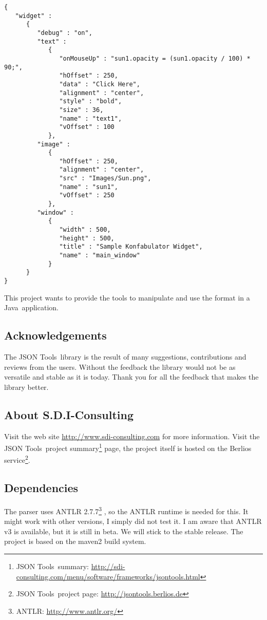 \documentclass[a4paper]{article}
\newcommand{\jtools}{JSON Tools}
\newcommand{\java}{Java}
\begin{document}
\medskip
\begin{lstlisting}
{
   "widget" :
      {
         "debug" : "on",
         "text" :
            {
               "onMouseUp" : "sun1.opacity = (sun1.opacity / 100) * 90;",
               "hOffset" : 250,
               "data" : "Click Here",
               "alignment" : "center",
               "style" : "bold",
               "size" : 36,
               "name" : "text1",
               "vOffset" : 100
            },
         "image" :
            {
               "hOffset" : 250,
               "alignment" : "center",
               "src" : "Images/Sun.png",
               "name" : "sun1",
               "vOffset" : 250
            },
         "window" :
            {
               "width" : 500,
               "height" : 500,
               "title" : "Sample Konfabulator Widget",
               "name" : "main_window"
            }
      }
}
\end{lstlisting}
\medskip

This project wants to provide the tools to manipulate and use the format in a \java\ application. 

\subsection{Acknowledgements}
The \jtools\ library is the result of many suggestions, contributions and reviews from the users. Without the feedback the library would not be as versatile and stable as it is today. Thank you for all the feedback that makes the library better.

\subsection{About S.D.I-Consulting}

Visit the web site \url{http://www.sdi-consulting.com} for more information.
Visit the \jtools\ project summary\footnote{\jtools\ summary: \url{http://sdi-consulting.com/menu/software/frameworks/jsontools.html}} page, the project itself is hosted on the Berlios service\footnote{\jtools\  project page: \url{http://jsontools.berlios.de}}.

\subsection{Dependencies}

The parser uses ANTLR  2.7.7\footnote{ANTLR: \url{http://www.antlr.org/}} , so the ANTLR runtime is needed for this. It might work with other versions, I simply did not test it. I am aware that ANTLR v3 is available, but it is still in beta. We will stick to the stable release. The project is based on the maven2 build system.
\end{document}
